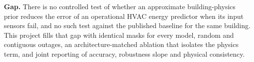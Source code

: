 \textbf{Gap.} There is no controlled test of whether an approximate building-physics prior reduces the error of an operational HVAC energy predictor when its input sensors fail, and no such test against the published baseline for the same building. This project fills that gap with identical masks for every model, random and contiguous outages, an architecture-matched ablation that isolates the physics term, and joint reporting of accuracy, robustness slope and physical consistency.
